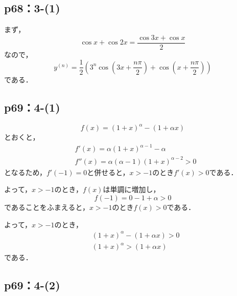\documentclass[uplatex,dvipdfmx,a4paper,10pt,fleqn]{jsarticle}
\begin{document}
\subsection*{p68：3-(1)}

\begin{tleftbar}
    まず，
    \[
        \cos x + \cos 2x = \frac{\cos 3x + \cos x}{2}
    \]
    なので，
    \[
        y^{(n)} = \frac{1}{2} \left  ( 3^n \cos \left (3x + \frac{n \pi}{2} \right)+ \cos \left (x + \frac{n \pi}{2}\right) \right)
    \]
    である．
\end{tleftbar}


\subsection*{p69：4-(1)}

\begin{tleftbar}
    \[
        f(x)=(1+x)^\alpha - (1+\alpha x)
    \]
    とおくと，
    \begin{align*} 
        &f'(x) = \alpha (1+x)^{\alpha -1} - \alpha \\
        & f''(x)= \alpha(\alpha-1) (1+x)^{\alpha -2} >0
    \end{align*} 
    となるため，$f'(-1)= 0$と併せると，$x>-1$のとき$f'(x) >0$である．

    よって，$ x>-1$のとき，$f(x)$は単調に増加し，
    \[
        f(-1)=0-1+\alpha >0
    \]
    であることをふまえると，$x>-1$のとき$f(x)>0$である．

    よって，$x>-1$のとき，
    \begin{align*} 
        & (1+x)^\alpha - (1+\alpha x)>0 \\
        & (1+x)^\alpha > (1+\alpha x)
    \end{align*} 
    である．
\end{tleftbar}


\subsection*{p69：4-(2)}
\end{document}
